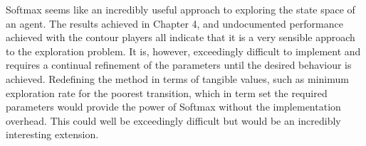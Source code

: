 \documentclass{rucsthesis}
\begin{document}
Softmax seems like an incredibly useful approach to exploring the state space of an agent. The results achieved in Chapter 4, and undocumented performance achieved with the contour players all indicate that it is a very sensible approach to the exploration problem. It is, however, exceedingly difficult to implement and requires a continual refinement of the parameters until the desired behaviour is achieved. Redefining the method in terms of tangible values, such as minimum exploration rate for the poorest transition, which in term set the required parameters would provide the power of Softmax without the implementation overhead. This could well be exceedingly difficult but would be an incredibly interesting extension.   


\end{document}
